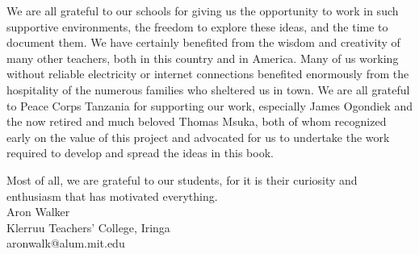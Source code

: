 We are all grateful to our schools 
for giving us the opportunity to work in such supportive environments, 
the freedom to explore these ideas, 
and the time to document them. 
We have certainly benefited from the wisdom 
and creativity of many other teachers, 
both in this country and in America. 
Many of us working without reliable electricity 
or internet connections benefited enormously 
from the hospitality of the numerous families 
who sheltered us in town. 
We are all grateful to Peace Corps Tanzania for supporting our work, 
especially James Ogondiek and the now retired and much beloved Thomas Msuka, 
both of whom recognized early on the value of this project 
and advocated for us to undertake the work required to develop 
and spread the ideas in this book.

Most of all, we are grateful to our students, 
for it is their curiosity and enthusiasm that has motivated everything.\\[24pt]
Aron Walker\\
Klerruu Teachers' College, Iringa\\
aronwalk@alum.mit.edu
